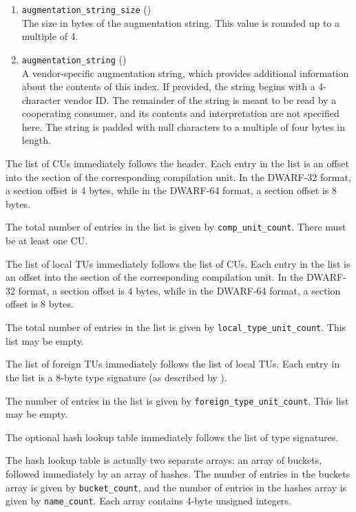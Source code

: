 \begin{enumerate}[1. ]
\item \texttt{augmentation\_string\_size} (\HFTuword) \\
The size in bytes of the augmentation string. This value is
rounded up to a multiple of 4.

\item \texttt{augmentation\_string} (\HFTaugstring) \\
A vendor-specific augmentation string, which provides additional 
information about the contents of this index. If provided, the string
begins with a 4-character vendor ID. The remainder of the
string is meant to be read by a cooperating consumer, and its
contents and interpretation are not specified here. The
string is padded with null characters to a multiple of
four bytes in length.

\end{enumerate}

The list of CUs immediately follows the header. Each entry in the 
list is an offset into the \dotdebuginfo{} section of the corresponding 
compilation unit. In the DWARF-32 format, a section offset is 4
bytes, while in the DWARF-64 format, a section offset is 8 bytes.

The total number of entries in the list is given by \texttt{comp\_unit\_count}.
There must be at least one CU.

The list of local TUs immediately follows the list of CUs. Each 
entry in the list is an offset into the \dotdebuginfo{} section 
of the corresponding compilation unit. In the DWARF-32 format, a section
offset is 4 bytes, while in the DWARF-64 format, a section offset is 8
bytes.

The total number of entries in the list is given by
\texttt{local\_type\_unit\_count}. This list may be empty.

The list of foreign TUs immediately follows the list of local TUs.
Each entry in the list is a 8-byte type signature (as described by
\DWFORMrefsigeight).

The number of entries in the list is given by \texttt{foreign\_type\_unit\_count}.
This list may be empty.

The optional hash lookup table immediately follows the list of type signatures.

The hash lookup table is actually two separate arrays: an array of
buckets, followed immediately by an array of hashes. The number of
entries in the buckets array is given by \texttt{bucket\_count}, and the number
of entries in the hashes array is given by \texttt{name\_count}. Each array
contains 4-byte unsigned integers.

